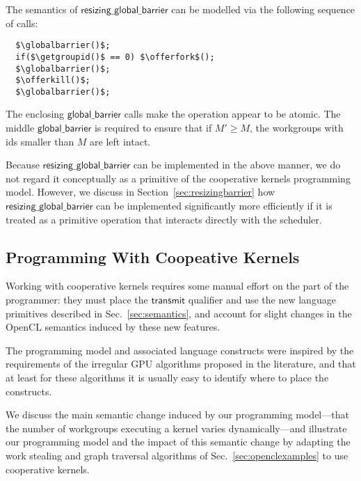 \documentclass[numbers,nocopyrightspace,10pt]{sigplanconf}
\newcommand{\mysec}{Sec.~}
\newcommand{\transmit}{\mathsf{transmit}}
\newcommand{\offerfork}{\mathsf{offer\_fork}}
\newcommand{\offerkill}{\mathsf{offer\_kill}}
\newcommand{\globalbarrier}{\mathsf{global\_barrier}}
\newcommand{\resizingglobalbarrier}{\mathsf{resizing\_global\_barrier}}
\newcommand{\getgroupid}{\mathsf{get\_group\_id}}
\begin{document}
The semantics of $\resizingglobalbarrier$ can be modelled via the following sequence of calls:

\lstset{basicstyle=\tt,numbers=none}
\begin{lstlisting}
  $\globalbarrier()$;
  if($\getgroupid()$ == 0) $\offerfork$();
  $\globalbarrier()$;
  $\offerkill()$;
  $\globalbarrier()$;
\end{lstlisting}
\lstset{basicstyle=\scriptsize\tt,numbers=left}

The enclosing $\globalbarrier$ calls make the operation appear to be
atomic.  The middle $\globalbarrier$ is required to ensure that if
$M'\geq M$, the workgroups with ids smaller than $M$ are left intact.

Because $\resizingglobalbarrier$ can be implemented in the above
manner, we do not regard it conceptually as a primitive of the
cooperative kernels programming model.  However, we discuss in
Section~\ref{sec:resizingbarrier} how $\resizingglobalbarrier$ can be
implemented significantly more efficiently if it is treated as a
primitive operation that interacts directly with the scheduler.

\subsection{Programming With Coopeative Kernels}\label{sec:programmingguidelines}

Working with cooperative kernels requires some manual effort on the
part of the programmer: they must place the $\transmit$ qualifier and
use the new language primitives described in
\mysec\ref{sec:semantics}, and account for slight changes in the OpenCL semantics induced by these new features.

The programming model and associated language constructs were inspired
by the requirements of the irregular GPU algorithms proposed in the
literature, and that at least for these algorithms it is usually easy
to identify where to place the constructs.

We discuss the main semantic change induced by our programming
model---that the number of workgroups executing a kernel varies
dynamically---and illustrate our programming model and the impact of
this semantic change by adapting the work stealing and graph traversal
algorithms of \mysec\ref{sec:openclexamples} to use cooperative
kernels.
\end{document}
